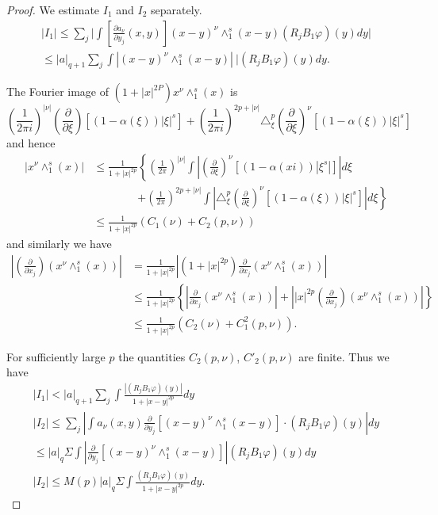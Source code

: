 \begin{proof}
We estimate $I_1$ and  $I_2$ separately.
\begin{gather*}
|I_1| \leq \sum\limits_j \big| \int \left[\frac{\partial a_\nu}{ \partial y_j}
  (x, y) \right] (x - y)^\nu \wedge^s_1 (x-y ) (R_j B_1 \varphi )
(y)dy \big|\\  
 \leq |a|_{q+1} \sum\limits_j \int |(x-y)^\nu \wedge^s_1 (x-y)|~| (R_j
 B_1 \varphi ) (y)dy. 
\end{gather*}

The Fourier image of $(1 +|x|^{2 P}) x^\nu \wedge^s_1 (x)$ is 
$$
\left(\frac{1}{2 \pi i}\right)^{|\nu |} \left(\frac{\partial}{\partial
  \xi}\right) \left[ (1- 
  \alpha (\xi ))| \xi|^s \right] + \left(\frac{1}{2 \pi i}\right)^{2p + |\nu|}
\triangle^p_\xi \left(\frac{\partial}{\partial \xi}\right)^\nu \left[(1- \alpha
  (\xi))|\xi|^s \right] 
$$
and hence 
\begin{align*}
|x^\nu \wedge^s_1 (x) | & \leq \frac{1}{1 + |x|^{2p}} \left\{
\left(\frac{1}{2 \pi}\right)^{|\nu|} \int |\left(\frac{\partial}
     {\partial \xi}\right)^\nu 
\left[(1-\alpha (xi )) |\xi^s| \right]| d \xi \right. \\
& \qquad \qquad \left. + \left(\frac{1}{2 \pi}\right)^{2p+|\nu|} \int  
| \triangle^p_\xi \left(\frac{\partial}{\partial \xi}\right)^\nu 
\left[(1- \alpha (\xi))| \xi|^s \right] | d \xi \right\} \\ 
 & \leq \frac{1}{1+|x|^{2p}} (C_1 (\nu ) + C_2 (p, \nu ))
\end{align*}
and similarly we have
{\fontsize{10pt}{12pt}\selectfont
\begin{align*}
\left|\left(\frac{\partial}{\partial x_j}\right) 
(x^\nu \wedge^s_1 (x)) \right| & =
\frac{1}{1+|x|^{2p}} \left|(1 + |x|^{2p} ) \frac{\partial }{\partial x_j}
(x^\nu \wedge^s_1 (x)) \right|\\ 
& \leq  \frac{1}{1+|x|^{2p}} \left\{ \left| \frac{\partial }{\partial x_j}
(x^\nu \wedge^s_1 (x)) \right|+ \left| |x|^{2p}
\left(\frac{\partial}{\partial x_j}\right) 
(x^\nu \wedge^s_1 (x))\right| \right\}\\ 
&\leq \frac{1}{1+|x|^{2p}} (C_2 ( \nu ) + C^2_1 (p, \nu )).
\end{align*}}\relax\pageoriginale

For sufficiently large $p$ the quantities $C_2 (p, \nu )$, $C'_2 (p,
\nu)$ are finite. Thus we have  
\begin{gather*}
|I_1| < |a|_{q+1} \sum\limits_j \int \frac{| (R_j B_1 \varphi )(y)|}{
  1+ |x-y|^{2p}} dy  \tag{5.25}\label{chap3-eq5.25}\\
|I_2| \leq \sum_j \left| \int a_\nu (x, y) \frac{\partial}{\partial y_j} \left[
  (x-y)^\nu \wedge^s_1 (x-y) \right] \cdot (R_j B_1 \varphi
)(y)\right| dy \\  
\leq |a|_q \Sigma \int \left| \frac{\partial }{\partial y_j} \left[(x-y)^\nu
  \wedge^s_1 (x-y) \right]\right| (R_j B_1 \varphi )(y)  dy  \\
|I_2|  \leq M (p)|a|_q \Sigma \int \frac{(R_j B_1 \varphi )(y)}{1+
  |x-y|^{2p}} dy . \tag{5.26}\label{chap3-eq5.26}
\end{gather*}


\end{proof}
